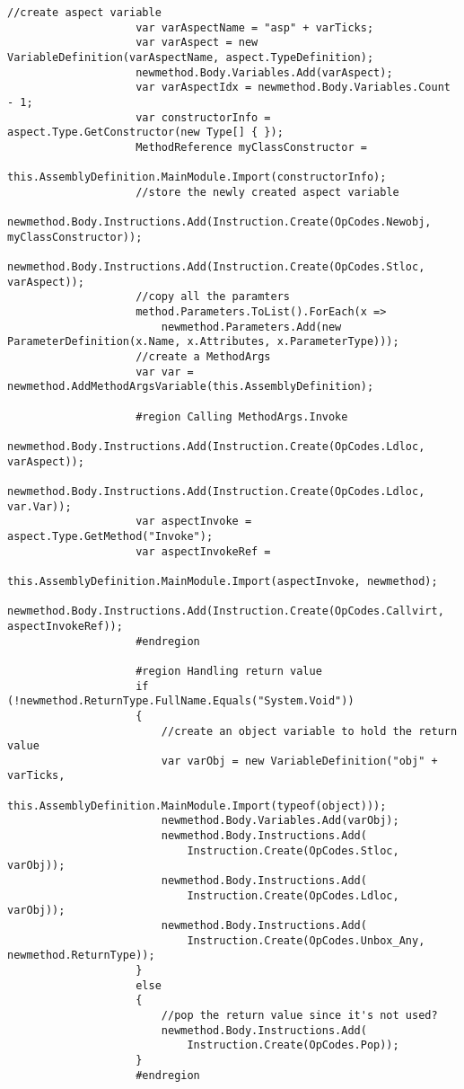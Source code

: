 \begin{lstlisting}[caption={../buffalo/Injectors/MethodAroundInjector.cs}, label=../buffalo/Injectors/MethodAroundInjector.cs, frame=tb, basicstyle=\scriptsize]
                    //create aspect variable
                    var varAspectName = "asp" + varTicks;
                    var varAspect = new VariableDefinition(varAspectName, aspect.TypeDefinition);
                    newmethod.Body.Variables.Add(varAspect);
                    var varAspectIdx = newmethod.Body.Variables.Count - 1;
                    var constructorInfo = aspect.Type.GetConstructor(new Type[] { });
                    MethodReference myClassConstructor =
                        this.AssemblyDefinition.MainModule.Import(constructorInfo);
                    //store the newly created aspect variable
                    newmethod.Body.Instructions.Add(Instruction.Create(OpCodes.Newobj, myClassConstructor));
                    newmethod.Body.Instructions.Add(Instruction.Create(OpCodes.Stloc, varAspect));
                    //copy all the paramters
                    method.Parameters.ToList().ForEach(x =>
                        newmethod.Parameters.Add(new ParameterDefinition(x.Name, x.Attributes, x.ParameterType)));
                    //create a MethodArgs
                    var var = newmethod.AddMethodArgsVariable(this.AssemblyDefinition);

                    #region Calling MethodArgs.Invoke
                    newmethod.Body.Instructions.Add(Instruction.Create(OpCodes.Ldloc, varAspect));
                    newmethod.Body.Instructions.Add(Instruction.Create(OpCodes.Ldloc, var.Var));
                    var aspectInvoke = aspect.Type.GetMethod("Invoke");
                    var aspectInvokeRef = 
                        this.AssemblyDefinition.MainModule.Import(aspectInvoke, newmethod);
                    newmethod.Body.Instructions.Add(Instruction.Create(OpCodes.Callvirt, aspectInvokeRef));
                    #endregion

                    #region Handling return value
                    if (!newmethod.ReturnType.FullName.Equals("System.Void"))
                    {
                        //create an object variable to hold the return value
                        var varObj = new VariableDefinition("obj" + varTicks,
                            this.AssemblyDefinition.MainModule.Import(typeof(object)));
                        newmethod.Body.Variables.Add(varObj);
                        newmethod.Body.Instructions.Add(
                            Instruction.Create(OpCodes.Stloc, varObj));
                        newmethod.Body.Instructions.Add(
                            Instruction.Create(OpCodes.Ldloc, varObj));
                        newmethod.Body.Instructions.Add(
                            Instruction.Create(OpCodes.Unbox_Any, newmethod.ReturnType));
                    }
                    else
                    {
                        //pop the return value since it's not used?
                        newmethod.Body.Instructions.Add(
                            Instruction.Create(OpCodes.Pop));
                    }
                    #endregion


\end{lstlisting}
